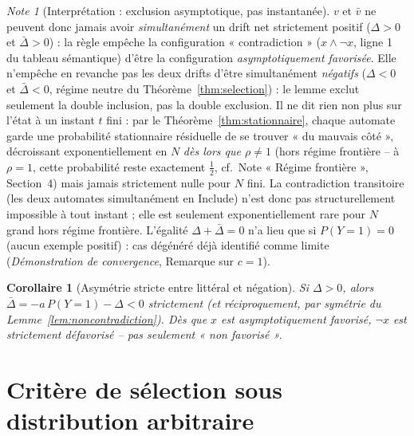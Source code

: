 \documentclass[12pt,a4paper]{article}
\newtheorem{corollary}[theorem]{Corollaire}
\theoremstyle{remark}
\newtheorem{note}{Note}[section]
\newcommand{\Inc}{\ensuremath{\mathrm{Include}}}
\newcommand{\vbar}{\bar{v}}
\begin{document}
\begin{note}[Interprétation : exclusion asymptotique, pas instantanée]
$v$ et $\vbar$ ne peuvent donc jamais avoir \emph{simultanément} un drift net
strictement positif ($\Delta>0$ et $\bar\Delta>0$) : la règle empêche la
configuration « contradiction » ($x\wedge\neg x$, ligne 1 du tableau
sémantique) d'être la configuration \emph{asymptotiquement favorisée}. Elle
n'empêche en revanche pas les deux drifts d'être simultanément
\emph{négatifs} ($\Delta<0$ et $\bar\Delta<0$, régime neutre du
Théorème~\ref{thm:selection}) : le lemme exclut seulement la double
inclusion, pas la double exclusion. Il ne dit rien non plus sur l'état à un
instant $t$ fini : par le Théorème~\ref{thm:stationnaire}, chaque automate
garde une probabilité stationnaire résiduelle de se trouver « du mauvais
côté », décroissant exponentiellement en $N$ \emph{dès lors que $\rho\ne1$}
(hors régime frontière -- à $\rho=1$, cette probabilité reste exactement
$\tfrac12$, cf.\ Note « Régime frontière », Section~4) mais jamais strictement
nulle pour $N$ fini. La contradiction transitoire (les deux automates
simultanément en $\Inc$) n'est donc pas structurellement impossible à tout
instant ; elle est seulement exponentiellement rare pour $N$ grand hors
régime frontière. L'égalité $\Delta+\bar\Delta=0$ n'a lieu que si $P(Y{=}1)=0$
(aucun exemple positif) : cas dégénéré déjà identifié comme limite
(\textit{Démonstration de convergence}, Remarque sur $c=1$).
\end{note}

\begin{corollary}[Asymétrie stricte entre littéral et négation]\label{cor:asymetrie}
Si $\Delta>0$, alors $\bar\Delta = -a\,P(Y{=}1) - \Delta < 0$
strictement (et réciproquement, par symétrie du Lemme~\ref{lem:noncontradiction}).
Dès que $x$ est asymptotiquement favorisé, $\neg x$ est \emph{strictement}
défavorisé -- pas seulement « non favorisé ».
\end{corollary}

\section{Critère de sélection sous distribution arbitraire}
\end{document}
